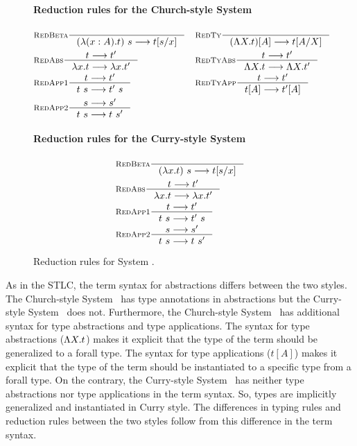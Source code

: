 \begin{figure}
\paragraph{Reduction rules for the Church-style System \F}
\begin{align*}
& \inference[\sc RedBeta]{}{(\l(x:A).t)~s --> t[s/x]}
&&\inference[\sc RedTy]{}{(\L X   .t)[A] --> t[A/X]} \\
& \inference[\sc RedAbs]{t --> t'}{\l x   .t --> \l x   .t'}
&&\inference[\sc RedTyAbs]{t --> t'}{\L X   .t --> \L X   .t'} \\
& \inference[\sc RedApp1]{t --> t'}{t~s --> t'~s}
&&\inference[\sc RedTyApp]{t --> t'}{t[A] --> t'[A]} \\
& \inference[\sc RedApp2]{s --> s'}{t~s --> t~s'}
\end{align*}
\paragraph{Reduction rules for the Curry-style System \F}
\begin{align*}
& \inference[\sc RedBeta]{}{(\l x   .t)~s --> t[s/x]} \\
& \inference[\sc RedAbs]{t --> t'}{\l x   .t --> \l x   .t'} \\
& \inference[\sc RedApp1]{t --> t'}{t~s --> t'~s} \\
& \inference[\sc RedApp2]{s --> s'}{t~s --> t~s'}
\end{align*}
\caption{Reduction rules for System \F.}
\label{fig:redf}
\end{figure}



As in the STLC, the term syntax for abstractions differs between the two styles.
The Church-style System \F\ has type annotations in abstractions but
the Curry-style System \F\ does not. Furthermore, the Church-style System \F\
has additional syntax for type abstractions and type applications. The syntax
for type abstractions ($\Lambda X.t$) makes it explicit that the type of the term
should be generalized to a forall type. The syntax for type applications
($t[A]$) makes it explicit that the type of the term should be instantiated to
a specific type from a forall type. On the contrary, the Curry-style System \F\
has neither type abstractions nor type applications in the term syntax.
So, types are implicitly generalized and instantiated in Curry style.
The differences in typing rules and reduction rules between the two styles
follow from this difference in the term syntax.

